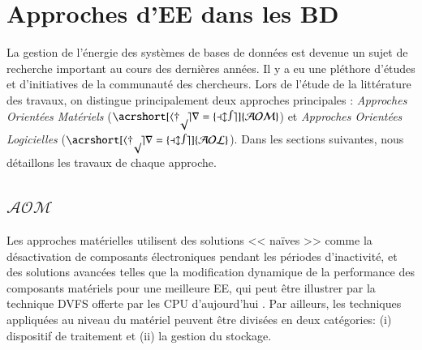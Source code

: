 \section{Approches d'EE dans les BD}

La gestion de l'énergie des systèmes de bases de données est devenue un sujet de recherche important au cours des dernières années. Il y a eu une pléthore d'études et d'initiatives de la communauté des chercheurs. Lors de l'étude de la littérature des travaux, on distingue principalement deux approches principales : \textit{Approches Orientées Matériels} ($\mathcal{\acrshort[hyper=false]{AOM}}$) et \textit{Approches Orientées Logicielles} ($\mathcal{\acrshort[hyper=false]{AOL}}$). Dans les sections suivantes, nous détaillons les travaux de chaque approche.

\subsection{$\mathcal{AOM}$}
Les approches matérielles utilisent des solutions << naïves >> comme la désactivation de composants électroniques pendant les périodes d'inactivité, et des solutions avancées telles que la modification dynamique de la performance des composants matériels pour une meilleure EE, qui peut être illustrer par la technique DVFS offerte par les CPU d'aujourd'hui \cite{Beloglazov11}. Par ailleurs, les techniques appliquées au niveau du matériel peuvent être divisées en deux catégories: (i) dispositif de traitement et (ii) la gestion du stockage.

